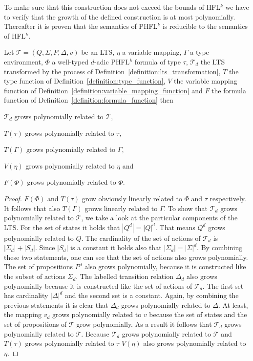 To make sure that this construction does not exceed the bounds of HFL$^k$ we have to verify that the growth of the defined construction is at most polynomially. Thereafter it is proven that the semantics of PHFL$^k$ is
reducible to the semantics of HFL$^k$.

\begin{lemma}
\label{lemma:phfl_to_hfl_polynomial}
Let $\mathcal{T} = (Q, \Sigma, P, \Delta, v)$ be an LTS, $\eta$ a variable mapping, $\Gamma$ a type environment, $\Phi$ a well-typed $d$-adic
    PHFL$^k$ formula of type $\tau$, $\mathcal{T}_d$ the LTS transformed by the process of
    Definition~\ref{definition:lts_transformation}, $T$ the type function of Definition~\ref{definition:type_function},
    $V$ the variable mapping function of Definition~\ref{definition:variable_mapping_function}
    and $F$ the formula function of Definition~\ref{definition:formula_function} then 
    \begin{compactitem}
    \item $\mathcal{T}_d$ grows polynomially related to $\mathcal{T}$, 
    \item $T(\tau)$ grows polynomially related to $\tau$,
    \item $T(\Gamma)$ grows polynomially related to $\Gamma$,
    \item $V(\eta)$ grows polynomially related to $\eta$ and
    \item $F(\Phi)$ grows polynomially related to $\Phi$.
    \end{compactitem}
\end{lemma}

\begin{proof}
	$F(\Phi)$ and $T(\tau)$ grow obviously linearly related to $\Phi$ and $\tau$ 
	respectively. It follows that also $T(\Gamma)$ grows linearly related to $\Gamma$. To show 
	that $\mathcal{T}_d$ grows polynomially related to $\mathcal{T}$, we take a look at the particular 
	components of the LTS. For the set of states it holds that $|Q^d| = |Q|^d$. That means $Q^d$ 
	grows polynomially related to $Q$. The cardinality of the set of actions of $\mathcal{T}_d$ is 
	$|\Sigma_d| + |S_d|$. Since $|S_d|$ is a constant it holds also that $|\Sigma_d| = |\Sigma|^d$. 
	By combining these two statements, one can see that the set of actions also grows polynomially. The set of propositions $P^d$ also grows 
	polynomially, because it is constructed like the subset of actions $\Sigma_d$. The labelled 
	transition relation $\Delta_d$ also grows polynomially because it is constructed like the set of 
	actions of $\mathcal{T}_d$. The first set has cardinality $|\Delta|^d$ and the second set is a 
	constant. Again, by combining the previous statements it is clear that $\Delta_d$ grows polynomially related to $\Delta$. At least, the 
	mapping $v_d$ grows polynomially related to $v$ because the set of states and the set of 
	propositions of $\mathcal{T}$ grow polynomially. As a result it follows that $
	\mathcal{T}_d$ grows polynomially related to $\mathcal{T}$. Because $\mathcal{T}_d$ grows 
	polynomially related to $\mathcal{T}$ and $T(\tau)$ grows polynomially related to $\tau$  
	$V(\eta)$ also grows polynomially related to $\eta$. 
\end{proof}

